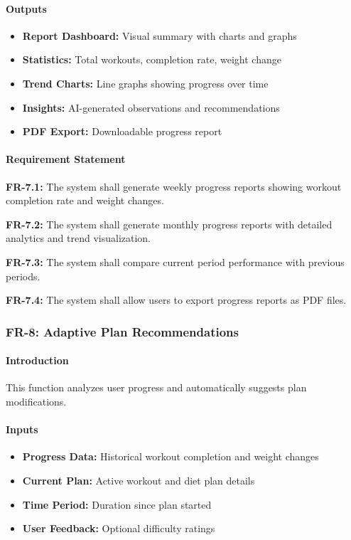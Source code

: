 \documentclass[12pt,a4paper]{article}
\begin{document}
\paragraph{Outputs}
\begin{itemize}
    \item \textbf{Report Dashboard:} Visual summary with charts and graphs
    \item \textbf{Statistics:} Total workouts, completion rate, weight change
    \item \textbf{Trend Charts:} Line graphs showing progress over time
    \item \textbf{Insights:} AI-generated observations and recommendations
    \item \textbf{PDF Export:} Downloadable progress report
\end{itemize}

\paragraph{Requirement Statement}
\textbf{FR-7.1:} The system shall generate weekly progress reports showing workout completion rate and weight changes.

\textbf{FR-7.2:} The system shall generate monthly progress reports with detailed analytics and trend visualization.

\textbf{FR-7.3:} The system shall compare current period performance with previous periods.

\textbf{FR-7.4:} The system shall allow users to export progress reports as PDF files.

\subsubsection{FR-8: Adaptive Plan Recommendations}

\paragraph{Introduction}
This function analyzes user progress and automatically suggests plan modifications.

\paragraph{Inputs}
\begin{itemize}
    \item \textbf{Progress Data:} Historical workout completion and weight changes
    \item \textbf{Current Plan:} Active workout and diet plan details
    \item \textbf{Time Period:} Duration since plan started
    \item \textbf{User Feedback:} Optional difficulty ratings
\end{itemize}
\end{document}
